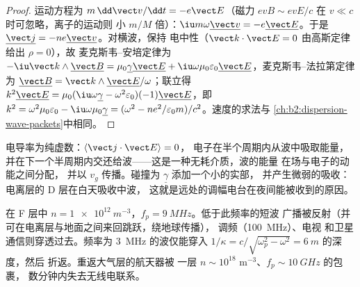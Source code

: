 \begin{proof}
运动方程为 $m\,\dd\vect v/\dd t = -e\vect E$（磁力
$ev B \sim evE/c$ 在 $v \ll c$ 时可忽略，离子的运动则
小 $m/M$ 倍）：$\iu m\omega\underline{\vect v} = -e\underline{\vect E}$。于是
$\underline{\vect j} = -ne\underline{\vect v}$。对横波，保持
电中性（$\vect k\cdot\vect E = 0$ 由高斯定律给出 $\rho = 0$），故
麦克斯韦–安培定律为 $-\iu\vect k\wedge\underline{\vect B} = \mu_0\underline\gamma\underline{\vect E}
+ \iu\omega\mu_0\varepsilon_0\underline{\vect E}$，麦克斯韦–法拉第定律为 $\underline{\vect B} = \vect k
\wedge\underline{\vect E}/\omega$；联立得 $k^2\underline{\vect E} = \mu_0(\iu\omega\underline\gamma -
\omega^2\varepsilon_0)(-1)\underline{\vect E}$，即 $k^2 = \omega^2\mu_0\varepsilon_0 - \iu\omega\mu_0
\underline\gamma = (\omega^2 - ne^2/\varepsilon_0m)/c^2$。速度的求法与
\cref{ch:b2:dispersion-wave-packets}中相同。
\end{proof}

\begin{remark}[能量去向]\label{rem:b2:waves-in-media:plasmaenergy}
电导率为纯虚数：$\langle\vect j\cdot\vect E\rangle = 0$，
电子在半个周期内从波中吸取能量，
并在下一个半周期内交还给波——这是一种无耗介质，波的能量
在场与电子的动能之间分配，
并以 $v_g$ 传播。碰撞为 $\underline\gamma$ 添加一个小的实部，
并产生微弱的吸收：电离层的 D 层在白天吸收中波，
这就是远处的调幅电台在夜间能被收到的原因。
\end{remark}

\begin{example}[电离层与无线电]\label{ex:b2:waves-in-media:ionosphere}
在 F 层中 $n = \qty{1e12}{m^{-3}}$，$f_p = \qty{9}{MHz}$。低于此频率的短波
广播被反射（并可在电离层与地面之间来回跳跃，绕地球传播），
调频（\qty{100}{MHz}）、电视
和卫星通信则穿透过去。频率为 \qty{3}{MHz} 的波仅能穿入
$1/\kappa = c/\sqrt{\omega_p^2 - \omega^2} = \qty{6}{m}$ 的深度，然后
折返。重返大气层的航天器被
一层 $n \sim 10^{18}$ m$^{-3}$、$f_p \sim \qty{10}{GHz}$ 的包裹，
数分钟内失去无线电联系。
\end{example}

